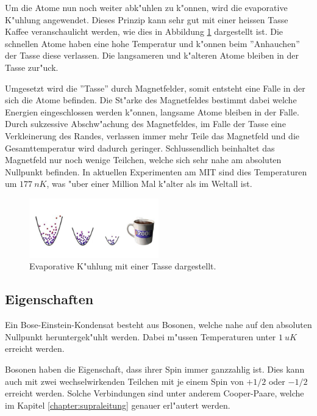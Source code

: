 \begin{refsection}
Um die Atome nun noch weiter abk"uhlen zu k"onnen, wird die evaporative K"uhlung angewendet. Dieses Prinzip kann sehr gut mit einer heissen Tasse Kaffee veranschaulicht werden, wie dies in Abbildung \ref{fig:EvaporativeKuehlung} dargestellt ist. Die schnellen Atome haben eine hohe Temperatur und k"onnen beim ''Anhauchen'' der Tasse diese verlassen. Die langsameren und k"alteren Atome bleiben in der Tasse zur"uck.

Umgesetzt wird die ''Tasse'' durch Magnetfelder, somit entsteht eine Falle in der sich die Atome befinden. Die St"arke des Magnetfeldes bestimmt dabei welche Energien eingeschlossen werden k"onnen, langsame Atome bleiben in der Falle. Durch sukzessive Abschw"achung des Magnetfeldes, im Falle der Tasse eine Verkleinerung des Randes, verlassen immer mehr Teile das Magnetfeld und die Gesamttemperatur wird dadurch geringer. Schlussendlich beinhaltet das Magnetfeld nur noch wenige Teilchen, welche sich sehr nahe am absoluten Nullpunkt befinden. In aktuellen Experimenten am MIT sind dies Temperaturen um $177~nK$, was "uber einer Million Mal k"alter als im Weltall ist. \cite{bose:WikiEvaporativeKuehlung}

\begin{figure}
	\centering
	\includegraphics[width = 0.5\textwidth]{./bose/evaporation.png}
	\caption{Evaporative K"uhlung mit einer Tasse dargestellt.}
	\label{fig:EvaporativeKuehlung}
\end{figure}

\subsection{Eigenschaften}
Ein Bose-Einstein-Kondensat besteht aus Bosonen, welche nahe auf den absoluten Nullpunkt heruntergek"uhlt werden. Dabei m"ussen Temperaturen unter $1~uK$ erreicht werden.
 
Bosonen haben die Eigenschaft, dass ihrer Spin immer ganzzahlig ist. Dies kann auch mit zwei wechselwirkenden Teilchen mit je einem Spin von $+1/2$ oder $-1/2$ erreicht werden. Solche Verbindungen sind unter anderem Cooper-Paare, welche im Kapitel \ref{chapter:supraleitung} genauer erl"autert werden. 


\end{refsection}
